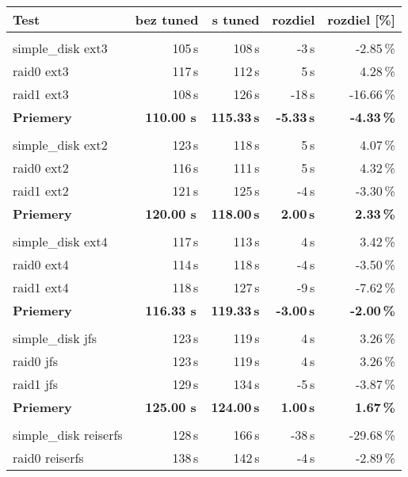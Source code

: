 \begin{table}[H]
\begin{center}
\begin{tabular}{|l|r r r r|}
    \hline
    \textbf{Test} & \textbf{bez tuned} & \textbf{s tuned} & \textbf{rozdiel} & \textbf{rozdiel [\%]} \\
    \hline & \\[-1em]\hline
    simple\_disk ext3 & 105\,s & 108\,s & -3\,s & -2.85\,\% \\
    raid0 ext3 & 117\,s & 112\,s & 5\,s & 4.28\,\% \\
    raid1 ext3 & 108\,s & 126\,s & -18\,s & -16.66\,\% \\
    \hline
    \textbf{Priemery} & \textbf{110.00 s}\,& \textbf{115.33\,s} & \textbf{-5.33\,s} & \textbf{-4.33\,\%} \\
    \hline & \\[-1em]\hline
    simple\_disk ext2 & 123\,s & 118\,s & 5\,s & 4.07\,\% \\
    raid0 ext2 & 116\,s & 111\,s & 5\,s & 4.32\,\% \\
    raid1 ext2 & 121\,s & 125\,s & -4\,s & -3.30\,\% \\
    \hline
    \textbf{Priemery} & \textbf{120.00 s}\,& \textbf{118.00\,s} & \textbf{2.00\,s} & \textbf{2.33\,\%} \\
    \hline & \\[-1em]\hline
    simple\_disk ext4 & 117\,s & 113\,s & 4\,s & 3.42\,\% \\
    raid0 ext4 & 114\,s & 118\,s & -4\,s & -3.50\,\% \\
    raid1 ext4 & 118\,s & 127\,s & -9\,s & -7.62\,\% \\
    \hline
    \textbf{Priemery} & \textbf{116.33 s}\,& \textbf{119.33\,s} & \textbf{-3.00\,s} & \textbf{-2.00\,\%} \\
    \hline & \\[-1em]\hline
    simple\_disk jfs & 123\,s & 119\,s & 4\,s & 3.26\,\% \\
    raid0 jfs & 123\,s & 119\,s & 4\,s & 3.26\,\% \\
    raid1 jfs & 129\,s & 134\,s & -5\,s & -3.87\,\% \\
    \hline
    \textbf{Priemery} & \textbf{125.00 s}\,& \textbf{124.00\,s} & \textbf{1.00\,s} & \textbf{1.67\,\%} \\
    \hline & \\[-1em]\hline
    simple\_disk reiserfs & 128\,s & 166\,s & -38\,s & -29.68\,\% \\
    raid0 reiserfs & 138\,s & 142\,s & -4\,s & -2.89\,\% \\

\end{tabular}
\end{center}
\end{table}

